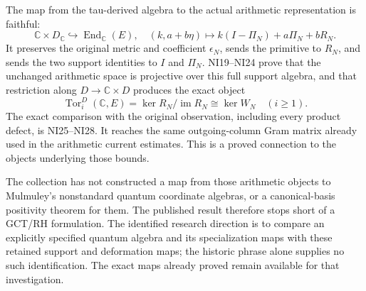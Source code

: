 \documentclass[
]{article}
\begin{document}
The map from the tau-derived algebra to the actual arithmetic
representation is faithful: \[
\mathbb C\times D_{\mathbb C}\hookrightarrow\operatorname{End}_{\mathbb C}(E),
\quad(k,a+b\eta)\mapsto k(I-\Pi_N)+a\Pi_N+bR_N.
\tag{LB3}
\] It preserves the original metric and coefficient \(\epsilon_N\),
sends the primitive to \(R_N\), and sends the two support identities to
\(I\) and \(\Pi_N\). NI19--NI24 prove that the unchanged arithmetic
space is projective over this full support algebra, and that restriction
along \(D\to\mathbb C\times D\) produces the exact object \[
\operatorname{Tor}^{D}_i(\mathbb C,E)
=\ker R_N/\operatorname{im}R_N\cong\ker W_N\quad(i\ge1).
\tag{LB4}
\] The exact comparison with the original observation, including every
product defect, is NI25--NI28. It reaches the same outgoing-column Gram
matrix already used in the arithmetic current estimates. This is a
proved connection to the objects underlying those bounds.

The collection has not constructed a map from those arithmetic objects
to Mulmuley's nonstandard quantum coordinate algebras, or a
canonical-basis positivity theorem for them. The published result
therefore stops short of a GCT/RH formulation. The identified research
direction is to compare an explicitly specified quantum algebra and its
specialization maps with these retained support and deformation maps;
the historic phrase alone supplies no such identification. The exact
maps already proved remain available for that investigation.
\end{document}
